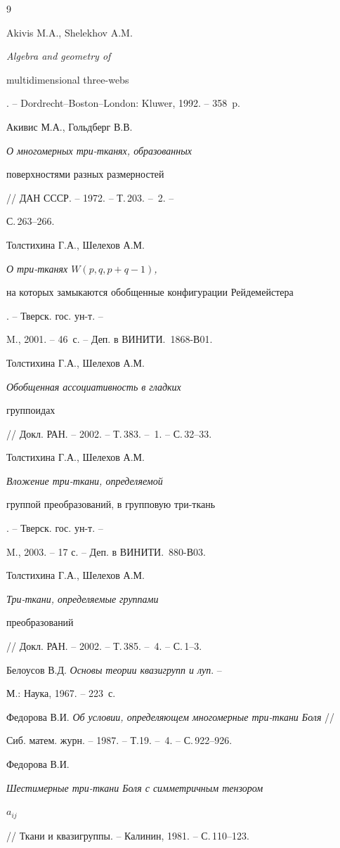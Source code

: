 \begin{thebibliography}{9}





 Akivis M.A., Shelekhov A.M. {\em Algebra and geometry of


multidimensional three-webs}. -- Dordrecht--Boston--London: Kluwer, 1992. -- 358~p.


 Акивис М.А., Гольдберг В.В. {\em О многомерных три-тканях, образованных


поверхностями разных размерностей} // ДАН СССР. -- 1972. -- Т.\,203. -- \No\,2. --


С.\,263--266.


 Толстихина Г.А., Шелехов А.М. {\em О три-тканях $W(p,q,p+q-1)$,


на которых замыкаются обобщенные конфигурации Рейдемейстера}. -- Тверск. гос. ун-т. --


M., 2001. -- 46~с. -- Деп. в ВИНИТИ. \No\,1868-В01.


 Толстихина Г.А., Шелехов А.М. {\em Обобщенная ассоциативность в гладких


группоидах} // Докл. РАН. -- 2002. -- Т.\,383. -- \No\,1. -- С.\,32--33.


 Толстихина Г.А., Шелехов А.М. {\em Вложение три-ткани, определяемой


группой преобразований, в групповую три-ткань}. -- Тверск. гос. ун-т. --


M., 2003. -- 17  с. -- Деп. в ВИНИТИ. \No\,880-В03.


 Толстихина Г.А., Шелехов А.М. {\em Три-ткани, определяемые группами 


преобразований} // Докл. РАН. -- 2002. -- Т.\,385. -- \No\,4. -- С.\,1--3.


 Белоусов В.Д. {\em Основы теории квазигрупп и луп}. --


М.: Наука, 1967. -- 223~с.


 Федорова В.И. {\em Об условии, определяющем многомерные три-ткани Боля} //


Сиб. матем. журн. -- 1987. -- Т.19. -- \No\,4. -- С.\,922--926.


 Федорова В.И. {\em Шестимерные три-ткани Боля с симметричным тензором


$a_{ij}$} // Ткани и квазигруппы. -- Калинин,  1981. -- С.\,110--123.








\end{thebibliography}





